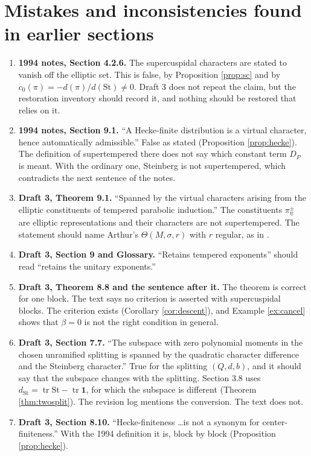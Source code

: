 \documentclass[12pt,letterpaper]{amsart}
\numberwithin{equation}{section}
\theoremstyle{definition}
\theoremstyle{remark}
\newcommand{\St}{\mathrm{St}}
\newcommand{\triv}{\mathbf 1}
\newcommand{\tr}{\operatorname{tr}}
\begin{document}
\section{Mistakes and inconsistencies found in earlier sections}
\begin{enumerate}[leftmargin=*]
\item \textbf{1994 notes, Section 4.2.6.} The supercuspidal characters are stated to vanish off the elliptic set. This is false, by Proposition \ref{prop:sc} and by $c_0(\pi)=-d(\pi)/d(\St)\neq0$. Draft 3 does not repeat the claim, but the restoration inventory should record it, and nothing should be restored that relies on it.
\item \textbf{1994 notes, Section 9.1.} ``A Hecke-finite distribution is a virtual character, hence automatically admissible.'' False as stated (Proposition \ref{prop:hecke}). The definition of supertempered there does not say which constant term $D_P$ is meant. With the ordinary one, Steinberg is not supertempered, which contradicts the next sentence of the notes.
\item \textbf{Draft 3, Theorem 9.1.} ``Spanned by the virtual characters arising from the elliptic constituents of tempered parabolic induction.'' The constituents $\pi_\eta^\pm$ are elliptic representations and their characters are not supertempered. The statement should name Arthur's $\Theta(M,\sigma,r)$ with $r$ regular, as in \cite[Theorem 3.1]{He94}.
\item \textbf{Draft 3, Section 9 and Glossary.} ``Retains tempered exponents'' should read ``retains the unitary exponents.''
\item \textbf{Draft 3, Theorem 8.8 and the sentence after it.} The theorem is correct for one block. The text says no criterion is asserted with supercuspidal blocks. The criterion exists (Corollary \ref{cor:descent}), and Example \ref{ex:cancel} shows that $\beta=0$ is not the right condition in general.
\item \textbf{Draft 3, Section 7.7.} ``The subspace with zero polynomial moments in the chosen unramified splitting is spanned by the quadratic character difference and the Steinberg character.'' True for the splitting $(Q,d,b)$, and it should say that the subspace changes with the splitting. Section 3.8 uses $d_{\St}=\tr\St-\tr\triv$, for which the subspace is different (Theorem \ref{thm:twosplit}). The revision log mentions the conversion. The text does not.
\item \textbf{Draft 3, Section 8.10.} ``Hecke-finiteness \dots is not a synonym for center-finiteness.'' With the 1994 definition it is, block by block (Proposition \ref{prop:hecke}).

\end{enumerate}
\end{document}

